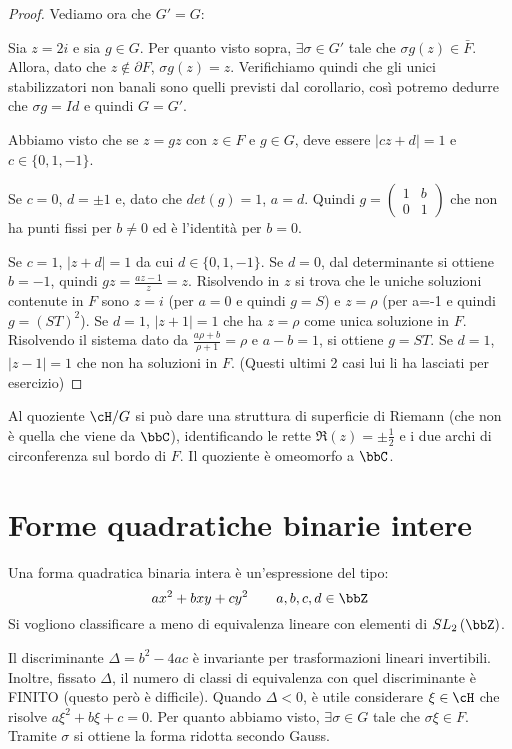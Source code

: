 \begin{proof}
\bigskip
Vediamo ora che $G'=G$:

Sia $z=2i$ e sia $g \in G$. Per quanto visto sopra, $\exists \sigma \in G'$
tale che $\sigma g(z) \in \bar{F}$. Allora, dato che $z \notin \partial F$,
$\sigma g(z)=z$.
Verifichiamo quindi che gli unici stabilizzatori non banali sono quelli
previsti dal corollario, così potremo dedurre che $\sigma g = Id$ e quindi
$G=G'$.

Abbiamo visto che se $z=gz$ con $z \in F$ e $g \in G$, deve essere
$|cz+d|=1$ e $c \in \{ 0,1,-1 \}$.

Se $c=0$, $d=\pm 1$ e, dato che $det(g)=1$, $a=d$. Quindi
$g=\left( \begin{array}{cc} 1 & b \\ 0 & 1 \end{array} \right)$ che non ha
punti fissi per $b\neq 0$ ed è l'identità per $b=0$.

Se $c=1$, $|z+d|=1$ da cui $d \in \{0,1,-1 \}$. Se $d=0$, dal determinante
si ottiene $b=-1$, quindi $gz=\frac{az-1}{z}=z$. Risolvendo in $z$ si trova
che le uniche soluzioni contenute in $F$ sono $z=i$ (per $a=0$ e quindi $g=S$)
e $z=\rho$ (per a=-1 e quindi $g=(ST)^2$).
Se $d=1$, $|z+1|=1$ che ha $z=\rho$ come unica soluzione in $F$. Risolvendo il
sistema dato da $\frac{a \rho +b}{\rho +1}=\rho$ e $a-b=1$, si ottiene $g=ST$.
Se $d=1$, $|z-1|=1$ che non ha soluzioni in $F$.
(Questi ultimi 2 casi lui li ha lasciati per esercizio)
\end{proof}

\begin{osservazione}
Al quoziente $\cH/G$ si può dare una struttura di superficie di Riemann
(che non è quella che viene da $\bbC$),
identificando le rette $\Re(z)=\pm \frac{1}{2}$ e i due archi di circonferenza
sul bordo di $F$. Il quoziente è omeomorfo a $\bbC$.
\end{osservazione}

\section{Forme quadratiche binarie intere}
Una forma quadratica binaria intera è un'espressione del tipo:
$$ ax^2+bxy+cy^2 \qquad a,b,c,d \in \bbZ $$
Si vogliono classificare a meno di equivalenza lineare con elementi di
$SL_2 \left( \bbZ \right)$.

\begin{osservazione}
Il discriminante $\Delta =b^2-4ac$ è invariante per trasformazioni lineari
invertibili. Inoltre, fissato $\Delta$, il numero di classi di equivalenza con
quel discriminante è FINITO (questo però è difficile).
Quando $\Delta < 0$, è utile considerare $\xi \in \cH$ che risolve
$a \xi^2 + b \xi + c =0$. Per quanto abbiamo visto, $\exists \sigma \in G$
tale che $\sigma \xi \in F$. Tramite $\sigma$ si ottiene la forma ridotta secondo
Gauss.
\end{osservazione}

